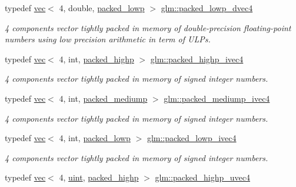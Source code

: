 \begin{DoxyCompactItemize}
typedef \mbox{\hyperlink{structglm_1_1vec}{vec}}$<$ 4, double, \mbox{\hyperlink{namespaceglm_a36ed105b07c7746804d7fdc7cc90ff25ac36a4bd74559be2c0b65bc48e5953b8b}{packed\+\_\+lowp}} $>$ \mbox{\hyperlink{group__gtc__type__aligned_ga54190c1986b9a3653bf49fddd81e753b}{glm\+::packed\+\_\+lowp\+\_\+dvec4}}
\begin{DoxyCompactList}\small\item\em 4 components vector tightly packed in memory of double-\/precision floating-\/point numbers using low precision arithmetic in term of U\+L\+Ps. \end{DoxyCompactList}\item 
typedef \mbox{\hyperlink{structglm_1_1vec}{vec}}$<$ 4, int, \mbox{\hyperlink{namespaceglm_a36ed105b07c7746804d7fdc7cc90ff25a8e8791ee77fe079b1291f710d88031bf}{packed\+\_\+highp}} $>$ \mbox{\hyperlink{group__gtc__type__aligned_gabf988b7dc66612bc1d4c9ce44d5b5642}{glm\+::packed\+\_\+highp\+\_\+ivec4}}
\begin{DoxyCompactList}\small\item\em 4 components vector tightly packed in memory of signed integer numbers. \end{DoxyCompactList}\item 
typedef \mbox{\hyperlink{structglm_1_1vec}{vec}}$<$ 4, int, \mbox{\hyperlink{namespaceglm_a36ed105b07c7746804d7fdc7cc90ff25a9604654c3b137cd7898689fd34b25bc0}{packed\+\_\+mediump}} $>$ \mbox{\hyperlink{group__gtc__type__aligned_gaea233dbda2d6eccdc4b72178eea9430f}{glm\+::packed\+\_\+mediump\+\_\+ivec4}}
\begin{DoxyCompactList}\small\item\em 4 components vector tightly packed in memory of signed integer numbers. \end{DoxyCompactList}\item 
typedef \mbox{\hyperlink{structglm_1_1vec}{vec}}$<$ 4, int, \mbox{\hyperlink{namespaceglm_a36ed105b07c7746804d7fdc7cc90ff25ac36a4bd74559be2c0b65bc48e5953b8b}{packed\+\_\+lowp}} $>$ \mbox{\hyperlink{group__gtc__type__aligned_ga4f09d3093b0d71b2348a5a680f6badbd}{glm\+::packed\+\_\+lowp\+\_\+ivec4}}
\begin{DoxyCompactList}\small\item\em 4 components vector tightly packed in memory of signed integer numbers. \end{DoxyCompactList}\item 
typedef \mbox{\hyperlink{structglm_1_1vec}{vec}}$<$ 4, \mbox{\hyperlink{group__core__precision_ga4fd29415871152bfb5abd588334147c8}{uint}}, \mbox{\hyperlink{namespaceglm_a36ed105b07c7746804d7fdc7cc90ff25a8e8791ee77fe079b1291f710d88031bf}{packed\+\_\+highp}} $>$ \mbox{\hyperlink{group__gtc__type__aligned_ga769bab317264c023f8ee77897e4b5894}{glm\+::packed\+\_\+highp\+\_\+uvec4}}

\end{DoxyCompactItemize}
